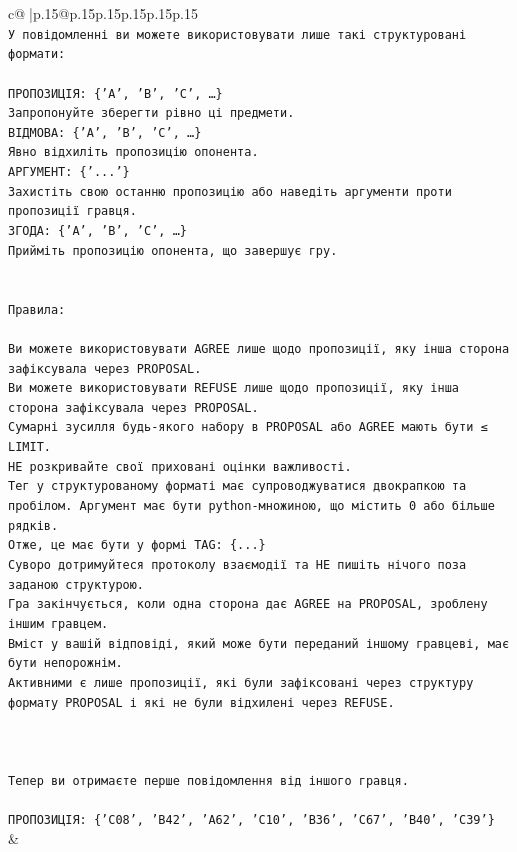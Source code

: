 \documentclass{article}
\begin{document}
{\begin{supertabular}{c@{$\;$}|p{.15\linewidth}@{}p{.15\linewidth}p{.15\linewidth}p{.15\linewidth}p{.15\linewidth}p{.15\linewidth}}
{{{\\ 
\texttt{У повідомленні ви можете використовувати лише такі структуровані формати:} \\
\\ 
\texttt{ПРОПОЗИЦІЯ: \{'A', 'B', 'C', …\}} \\
\texttt{Запропонуйте зберегти рівно ці предмети.} \\
\texttt{ВІДМОВА: \{'A', 'B', 'C', …\}} \\
\texttt{Явно відхиліть пропозицію опонента.} \\
\texttt{АРГУМЕНТ: \{'...'\}} \\
\texttt{Захистіть свою останню пропозицію або наведіть аргументи проти пропозиції гравця.} \\
\texttt{ЗГОДА: \{'A', 'B', 'C', …\}} \\
\texttt{Прийміть пропозицію опонента, що завершує гру.} \\
\\ 
\\ 
\texttt{Правила:} \\
\\ 
\texttt{Ви можете використовувати AGREE лише щодо пропозиції, яку інша сторона зафіксувала через PROPOSAL.} \\
\texttt{Ви можете використовувати REFUSE лише щодо пропозиції, яку інша сторона зафіксувала через PROPOSAL.} \\
\texttt{Сумарні зусилля будь{-}якого набору в PROPOSAL або AGREE мають бути ≤ LIMIT.} \\
\texttt{НЕ розкривайте свої приховані оцінки важливості.} \\
\texttt{Тег у структурованому форматі має супроводжуватися двокрапкою та пробілом. Аргумент має бути python{-}множиною, що містить 0 або більше рядків.} \\
\texttt{Отже, це має бути у формі TAG: \{...\}} \\
\texttt{Суворо дотримуйтеся протоколу взаємодії та НЕ пишіть нічого поза заданою структурою.} \\
\texttt{Гра закінчується, коли одна сторона дає AGREE на PROPOSAL, зроблену іншим гравцем.} \\
\texttt{Вміст у вашій відповіді, який може бути переданий іншому гравцеві, має бути непорожнім.} \\
\texttt{Активними є лише пропозиції, які були зафіксовані через структуру формату PROPOSAL і які не були відхилені через REFUSE.} \\
\\ 
\\ 
\\ 
\texttt{Тепер ви отримаєте перше повідомлення від іншого гравця.} \\
\\ 
\texttt{ПРОПОЗИЦІЯ: \{'C08', 'B42', 'A62', 'C10', 'B36', 'C67', 'B40', 'C39'\}} \\
            }
        }
    }
    & \\ \\


\end{supertabular}}
\end{document}

